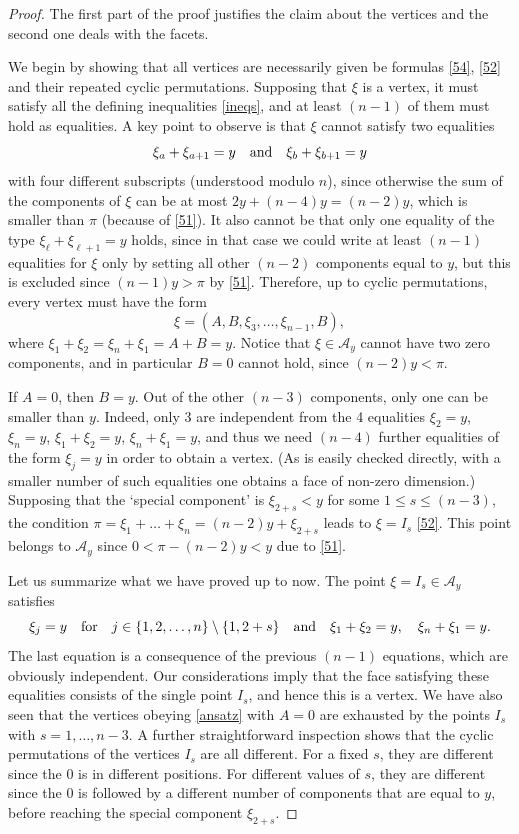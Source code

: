 \documentclass[a4paper,11pt,reqno]{amsart}
\theoremstyle{definition}
\numberwithin{equation}{section}
\newcommand{\be}{\begin{equation}}
\newcommand{\ee}{\end{equation}}
\def\cA{{\mathcal A}}                       %
\begin{document}
 \begin{proof}
The first part of the proof justifies the claim about the vertices and the second one deals with the facets.

 We begin by showing that all vertices are necessarily given be formulas \eqref{54}, \eqref{52} and their repeated cyclic permutations.
 Supposing that $\xi$ is a vertex, it must satisfy all the defining inequalities \eqref{ineqs}, and at least
 $(n-1)$ of them must hold as equalities.
 A key point to observe is that $\xi$ cannot satisfy two equalities
 \be
 \xi_a + \xi_{a+1} = y \quad \hbox{and}\quad \xi_{b}+ \xi_{b+1}=y
 \ee
with four different subscripts (understood modulo $n$), since otherwise the sum of the components of $\xi$ can be at most
$2y + (n-4)y = (n-2) y$, which is smaller than $\pi$ (because of \eqref{51}).
 It also cannot be that only one equality of the
type $\xi_\ell + \xi_{\ell +1} =y$ holds, since in that case we could write at least $(n-1)$  equalities for $\xi$ only by setting
all other $(n-2)$ components equal to $y$, but this is excluded since $(n-1) y > \pi$ by \eqref{51}.
 Therefore, up to cyclic permutations, every vertex must have the form
 \be
 \xi = (A, B,\xi_3,\dots, \xi_{n-1}, B),
 \label{ansatz} \ee
  where $\xi_1 + \xi_2 = \xi_n + \xi_1= A + B =y$.
  Notice that $\xi \in \cA_y$ cannot have two zero components, and in particular $B=0$ cannot hold, since $(n-2)y < \pi$.

 If $A=0$, then $B =y$. Out of the other $(n-3)$ components, only one can be smaller than $y$.
 Indeed, only 3 are independent from the 4 equalities $\xi_2=y$,  $\xi_n=y$, $\xi_1 + \xi_2=y$, $\xi_n + \xi_1=y$,
 and thus we need $(n-4)$ further equalities of the form $\xi_j=y$ in order to obtain a vertex.
 (As is  easily checked directly, with a smaller number of such equalities one obtains a face of non-zero dimension.)
 Supposing that the `special component' is $\xi_{2+s} <y$ for some $1\leq s \leq (n-3)$, the
 condition $\pi = \xi_1+ \dots + \xi_n  = (n-2) y + \xi_{2+s}$  leads to $\xi = I_s$ \eqref{52}.
 This point belongs to $\cA_y$ since  $0<\pi - (n-2)y <y$ due to \eqref{51}.

Let us summarize what we have proved up to now.
 The point $\xi=I_s\in \cA_y$ satisfies
\be
\xi_j = y\quad \hbox{for}\quad j \in \{1, 2,\dots,n\} \setminus \{1, 2+s\}
\quad\hbox{and}\quad \xi_1 + \xi_2 = y, \quad \xi_n + \xi_1 =y.
\label{53}\ee
The last equation is a consequence of the previous $(n-1)$ equations,
which are obviously independent. Our considerations imply
that the face satisfying these equalities consists of the single point $I_s$, and hence this is a vertex.
We have also seen that the vertices obeying \eqref{ansatz} with $A=0$ are exhausted by the
points $I_s$ with $s=1,\dots, n-3$.
A  further straightforward inspection shows that the cyclic permutations of the vertices $I_s$ are all different.
For a fixed $s$, they are different since the $0$ is in different positions.
For different values of $s$, they are different since the $0$ is followed by a different
number of components that are equal to $y$, before reaching the special component $\xi_{2+s}$.



\end{proof}
\end{document}
